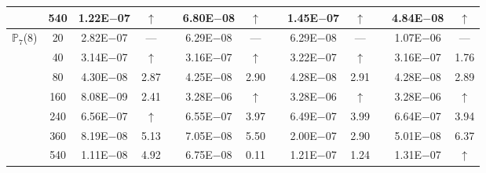 \begin{table}[H]
{\begin{tabular}{@{}l c c c c c c c c c c c c@{}}
 & 540 & 1.22E$-$07 & $\uparrow$  &  & 6.80E$-$08 & $\uparrow$ &  & 1.45E$-$07 & $\uparrow$ &  & 4.84E$-$08 & $\uparrow$\\
\midrule
\multirow{7}{*}{$\mathbb{P}_{7}$(8)}
 & 20 & 2.82E$-$07 & ---  &  & 6.29E$-$08 & --- &  & 6.29E$-$08 & --- &  & 1.07E$-$06 & ---\\
 & 40 & 3.14E$-$07 & $\uparrow$  &  & 3.16E$-$07 & $\uparrow$ &  & 3.22E$-$07 & $\uparrow$ &  & 3.16E$-$07 & 1.76\\
 & 80 & 4.30E$-$08 & 2.87  &  & 4.25E$-$08 & 2.90 &  & 4.28E$-$08 & 2.91 &  & 4.28E$-$08 & 2.89\\
 & 160 & 8.08E$-$09 & 2.41  &  & 3.28E$-$06 & $\uparrow$ &  & 3.28E$-$06 & $\uparrow$ &  & 3.28E$-$06 & $\uparrow$\\
 & 240 & 6.56E$-$07 & $\uparrow$  &  & 6.55E$-$07 & 3.97 &  & 6.49E$-$07 & 3.99 &  & 6.64E$-$07 & 3.94\\
 & 360 & 8.19E$-$08 & 5.13  &  & 7.05E$-$08 & 5.50 &  & 2.00E$-$07 & 2.90 &  & 5.01E$-$08 & 6.37\\
 & 540 & 1.11E$-$08 & 4.92  &  & 6.75E$-$08 & 0.11 &  & 1.21E$-$07 & 1.24 &  & 1.31E$-$07 & $\uparrow$\\
\bottomrule
\end{tabular}}
\label{PRO:bending:01_23_glob3v2}
\end{table}
